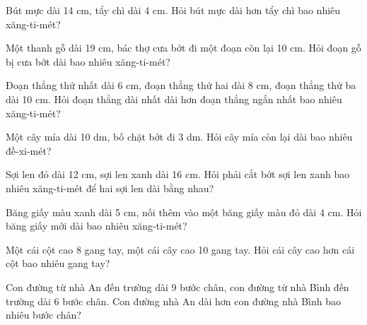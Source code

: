 \begin{ex}
Bút mực dài 14 cm, tẩy chì dài 4 cm. Hỏi bút mực dài hơn tẩy chì bao nhiêu xăng-ti-mét?
\end{ex}

\begin{ex}
Một thanh gỗ dài 19 cm, bác thợ cưa bớt đi một đoạn còn lại 10 cm. Hỏi đoạn gỗ bị cưa bớt dài bao nhiêu xăng-ti-mét?
\end{ex}

\begin{ex}
Đoạn thẳng thứ nhất dài 6 cm, đoạn thẳng thứ hai dài 8 cm, đoạn thẳng thứ ba dài 10 cm. Hỏi đoạn thẳng dài nhất dài hơn đoạn thẳng ngắn nhất bao nhiêu xăng-ti-mét?
\end{ex}

\begin{ex}
Một cây mía dài 10 dm, bố chặt bớt đi 3 dm. Hỏi cây mía còn lại dài bao nhiêu đề-xi-mét?
\end{ex}

\begin{ex}
Sợi len đỏ dài 12 cm, sợi len xanh dài 16 cm. Hỏi phải cắt bớt sợi len xanh bao nhiêu xăng-ti-mét để hai sợi len dài bằng nhau?
\end{ex}

\begin{ex}
Băng giấy màu xanh dài 5 cm, nối thêm vào một băng giấy màu đỏ dài 4 cm. Hỏi băng giấy mới dài bao nhiêu xăng-ti-mét?
\end{ex}

\begin{ex}
Một cái cột cao 8 gang tay, một cái cây cao 10 gang tay. Hỏi cái cây cao hơn cái cột bao nhiêu gang tay?
\end{ex}

\begin{ex}
Con đường từ nhà An đến trường dài 9 bước chân, con đường từ nhà Bình đến trường dài 6 bước chân. Con đường nhà An dài hơn con đường nhà Bình bao nhiêu bước chân?
\end{ex}


